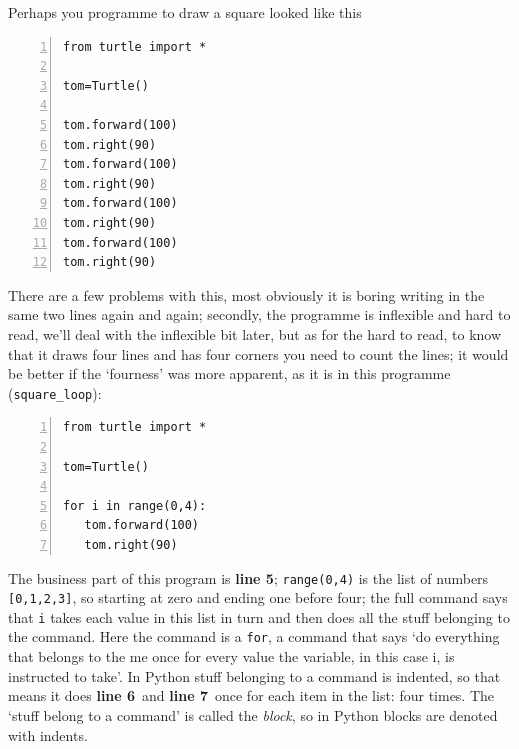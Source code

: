 \documentclass[11pt,a4paper]{scrartcl}
\newcommand{\lnn}[1]{\textbf{line #1}\,}
\begin{document}
Perhaps you programme to draw a square looked like this
\begin{lstlisting}[numbers=left]
from turtle import *

tom=Turtle()

tom.forward(100)
tom.right(90)
tom.forward(100)
tom.right(90)
tom.forward(100)
tom.right(90)
tom.forward(100)
tom.right(90)
\end{lstlisting}
There are a few problems with this, most obviously it is boring
writing in the same two lines again and again; secondly, the programme
is inflexible and hard to read, we'll deal with the inflexible bit
later, but as for the hard to read, to know that it draws four lines
and has four corners you need to count the lines; it would be better
if the \lq{}fourness\rq{} was more apparent, as it is in this
programme (\texttt{square\_loop}):
\begin{lstlisting}[numbers=left]
from turtle import *

tom=Turtle()

for i in range(0,4):
   tom.forward(100)
   tom.right(90)

\end{lstlisting}
The business part of this program is \textbf{line 5};
\texttt{range(0,4)} is the list of numbers \texttt{[0,1,2,3]}, so
starting at zero and ending one before four; the full command says
that \texttt{i} takes each value in this list in turn and then does
all the stuff belonging to the command. Here the command is a
\texttt{for}, a command that says \lq{}do everything that belongs to
the me once for every value the variable, in this case i, is
instructed to take\rq{}. In Python stuff belonging to a command is
indented, so that means it does \lnn{6} and \lnn{7} once for each item
in the list: four times. The \lq{}stuff belong to a command\rq{} is
called the \textsl{block}, so in Python blocks are denoted with
indents.  
\end{document}
